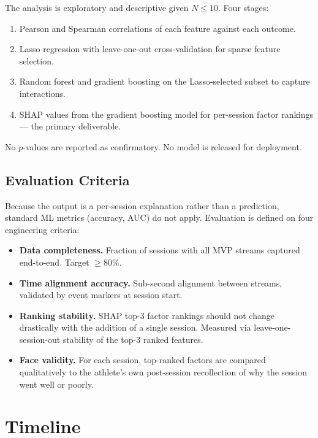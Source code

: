 \documentclass[sigconf,nonacm]{acmart}
\begin{document}
The analysis is exploratory and descriptive given $N \leq 10$. Four stages:

\begin{enumerate}
    \item Pearson and Spearman correlations of each feature against each outcome.
    \item Lasso regression with leave-one-out cross-validation for sparse feature selection.
    \item Random forest and gradient boosting on the Lasso-selected subset to capture interactions.
    \item SHAP values from the gradient boosting model for per-session factor rankings --- the primary deliverable.
\end{enumerate}

No $p$-values are reported as confirmatory. No model is released for deployment.

\subsection{Evaluation Criteria}

Because the output is a per-session explanation rather than a prediction, standard ML metrics (accuracy, AUC) do not apply. Evaluation is defined on four engineering criteria:

\begin{itemize}
    \item \textbf{Data completeness.} Fraction of sessions with all MVP streams captured end-to-end. Target $\geq 80\%$.
    \item \textbf{Time alignment accuracy.} Sub-second alignment between streams, validated by event markers at session start.
    \item \textbf{Ranking stability.} SHAP top-3 factor rankings should not change drastically with the addition of a single session. Measured via leave-one-session-out stability of the top-3 ranked features.
    \item \textbf{Face validity.} For each session, top-ranked factors are compared qualitatively to the athlete's own post-session recollection of why the session went well or poorly.
\end{itemize}

\section{Timeline}
\end{document}

